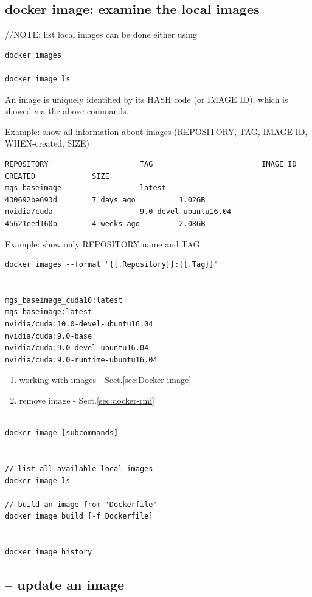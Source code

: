 \subsection{docker image: examine the local images}
\label{sec:docker-image-command}

//NOTE: list local images can be done either using
\begin{verbatim}
docker images 

docker image ls
\end{verbatim}
An image is uniquely identified by its HASH code (or IMAGE ID), which is showed
via the above commands.


Example: show all information about images (REPOSITORY, TAG, IMAGE-ID, WHEN-created, SIZE)
\begin{verbatim}
REPOSITORY                     TAG                         IMAGE ID            CREATED             SIZE
mgs_baseimage                  latest                      430692be693d        7 days ago          1.02GB
nvidia/cuda                    9.0-devel-ubuntu16.04       45621eed160b        4 weeks ago         2.08GB
\end{verbatim}


Example: show only REPOSITORY name and TAG 
\begin{verbatim}
docker images --format "{{.Repository}}:{{.Tag}}"


mgs_baseimage_cuda10:latest
mgs_baseimage:latest
nvidia/cuda:10.0-devel-ubuntu16.04
nvidia/cuda:9.0-base
nvidia/cuda:9.0-devel-ubuntu16.04
nvidia/cuda:9.0-runtime-ubuntu16.04

\end{verbatim}


\begin{enumerate}
  \item working with images - Sect.\ref{sec:Docker-image}
  \item remove image - Sect.\ref{sec:docker-rmi}
\end{enumerate}


\begin{verbatim}

docker image [subcommands]


// list all available local images
docker image ls

// build an image from 'Dockerfile'
docker image build [-f Dockerfile]


docker image history 
\end{verbatim}

\subsection{-- update an image}

